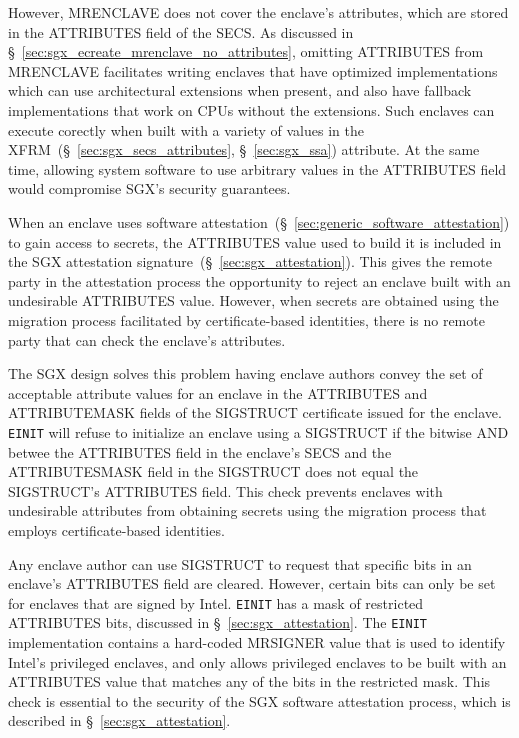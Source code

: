 
However, MRENCLAVE does not cover the enclave's attributes, which are stored in
the ATTRIBUTES field of the SECS. As discussed in
\S~\ref{sec:sgx_ecreate_mrenclave_no_attributes}, omitting ATTRIBUTES from
MRENCLAVE facilitates writing enclaves that have optimized implementations
which can use architectural extensions when present, and also have fallback
implementations that work on CPUs without the extensions. Such enclaves can
execute corectly when built with a variety of values in the
XFRM~(\S~\ref{sec:sgx_secs_attributes}, \S~\ref{sec:sgx_ssa}) attribute. At
the same time, allowing system software to use arbitrary values in the
ATTRIBUTES field would compromise SGX's security guarantees.

When an enclave uses software
attestation~(\S~\ref{sec:generic_software_attestation}) to gain access to
secrets, the ATTRIBUTES value used to build it is included in the SGX
attestation signature~(\S~\ref{sec:sgx_attestation}). This gives the remote
party in the attestation process the opportunity to reject an enclave built
with an undesirable ATTRIBUTES value. However, when secrets are obtained using
the migration process facilitated by certificate-based identities, there is no
remote party that can check the enclave's attributes.

The SGX design solves this problem having enclave authors convey the set of
acceptable attribute values for an enclave in the ATTRIBUTES and ATTRIBUTEMASK
fields of the SIGSTRUCT certificate issued for the enclave. \texttt{EINIT} will
refuse to initialize an enclave using a SIGSTRUCT if the bitwise AND betwee
the ATTRIBUTES field in the enclave's SECS and the ATTRIBUTESMASK field in the
SIGSTRUCT does not equal the SIGSTRUCT's ATTRIBUTES field. This check prevents
enclaves with undesirable attributes from obtaining secrets using the migration
process that employs certificate-based identities.

Any enclave author can use SIGSTRUCT to request that specific bits in an
enclave's ATTRIBUTES field are cleared. However, certain bits can only be set
for enclaves that are signed by Intel. \texttt{EINIT} has a mask of restricted
ATTRIBUTES bits, discussed in \S~\ref{sec:sgx_attestation}. The \texttt{EINIT}
implementation contains a hard-coded MRSIGNER value that is used to identify
Intel's privileged enclaves, and only allows privileged enclaves to be built
with an ATTRIBUTES value that matches any of the bits in the restricted mask.
This check is essential to the security of the SGX software attestation
process, which is described in \S~\ref{sec:sgx_attestation}.


